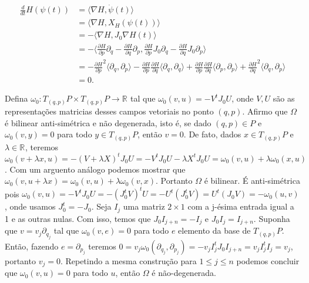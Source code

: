 \documentclass[12pt]{book}
\newcommand{\campohamiltoniano}[1]{X_{H}(#1)}
\newcommand{\derivada}[2]{\frac{d #1}{d #2}}
\newcommand{\derivadaparcial}[2]{\frac{\partial #1}{\partial #2}}
\newcommand{\derivadaparcialabrev}[1]{\partial_{#1}}
\newcommand{\estruturacomplexa}{J_{0}}
\newcommand{\formaSimpleticaabrev}{\omega_{0}}
\newcommand{\formaSimpleticaPadrao}[2]{\omega_{0}(#1, #2)}
\newcommand{\produtointerno}[2]{\langle #1, #2 \rangle}
\newcommand{\real}[1]{\mathbb{R}^{#1}}
\newcommand{\reta}{\real{}}
\begin{document}
	$$
	\begin{aligned}
	\derivada{}{t}H(\psi(t)) 
	&= \produtointerno{\nabla H}{\dot{\psi}(t)} 
	\\
	&= \produtointerno{\nabla H}{\campohamiltoniano{\psi(t)}} 
	\\
	&= 
	-\produtointerno{\nabla H}{\estruturacomplexa \nabla H(t)} 
	\\
	&=-\produtointerno{\derivadaparcial{H}{p}\derivadaparcialabrev{q} - \derivadaparcial{H}{q}\derivadaparcialabrev{p}
	}{\derivadaparcial{H}{p}\estruturacomplexa\derivadaparcialabrev{q} - \derivadaparcial{H}{q}\estruturacomplexa\derivadaparcialabrev{p}}
	\\
	&=-\derivadaparcial{H}{p}^{2}\produtointerno{\derivadaparcialabrev{q}
	}{\derivadaparcialabrev{p}}	-\derivadaparcial{H}{p}\derivadaparcial{H}{q}\produtointerno{\derivadaparcialabrev{q}}{\derivadaparcialabrev{q}}
	+\derivadaparcial{H}{p}\derivadaparcial{H}{q}\produtointerno{\derivadaparcialabrev{p}}{\derivadaparcialabrev{p}}	+\derivadaparcial{H}{q}^{2}\produtointerno{\derivadaparcialabrev{q}}{\derivadaparcialabrev{p}}
	\\
	&=0.
	\end{aligned}
	$$
	
	Defina $\formaSimpleticaabrev :T_{(q,p)} P \times T_{(q,p)} P \to \reta$ tal que $\formaSimpleticaabrev(v, u) = -V^{t}\estruturacomplexa U$, onde $V, U$ são as  representações matricias desses campos vetoriais no ponto $(q,p)$. Afirmo que $\Omega$ é bilinear anti-simétrica e não degenerada, isto é, se dado $(q,p) \in P$ e $\formaSimpleticaPadrao{v}{y} = 0$ para todo $y \in T_{(q,p)} P$, então $v = 0$. De fato, dados $x \in T_{(q,p)} P$ e $\lambda \in \reta$, teremos $\formaSimpleticaPadrao{v + \lambda x}{u} = -(V+\lambda X)^{t}\estruturacomplexa U = -V^{t}\estruturacomplexa U -\lambda X^{t}\estruturacomplexa U = \formaSimpleticaPadrao{v}{u} + \lambda\formaSimpleticaPadrao{x}{u}$. Com um arguento análogo podemos mostrar que $\formaSimpleticaPadrao{v}{u + \lambda x} =\formaSimpleticaPadrao{v}{u} + \lambda\formaSimpleticaPadrao{v}{x} $. Portanto $\Omega$ é bilinear. É anti-simétrica pois $\formaSimpleticaPadrao{v}{u} = -V^{t}\estruturacomplexa U = -(\estruturacomplexa^{t} V)^{t}U = -U^{t}(\estruturacomplexa^{t} V)= U^{t}(\estruturacomplexa V) = -\formaSimpleticaPadrao{u}{v}$, onde usamos $\estruturacomplexa^{t} = -\estruturacomplexa$. Seja $I_{j}$ uma matriz $2\times 1$ com a j-ésima entrada igual a 1 e as outras nulas. Com isso, temos que $\estruturacomplexa I_{j+n} = -I_{j}$ e $\estruturacomplexa I_{j} = I_{j+n}$. Suponha que $v = v_{j}\derivadaparcialabrev{q_{j}}$ tal que $\formaSimpleticaPadrao{v}{e} = 0$ para todo $e$ elemento da base de $T_{(q,p)} P$. Então, fazendo $e= \derivadaparcialabrev{p_{j}}$ teremos $0= v_{j}\formaSimpleticaPadrao{\derivadaparcialabrev{q_{j}}}{\derivadaparcialabrev{p_{j}}} = -v_{j}I_{j}^{t}\estruturacomplexa I_{j+n} = v_{j}I_{j}^{t}I_{j}=v_{j}$, portanto $v_{j} = 0$. Repetindo a mesma construção para $1\leq j \leq n$ podemos concluir que $\formaSimpleticaPadrao{v}{u} = 0$ para todo $u$, então $\Omega$ é não-degenerada.
	
\end{document}
